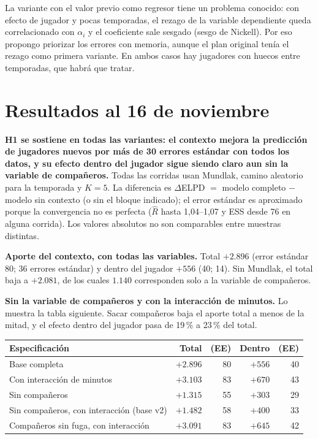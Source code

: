 \documentclass[11pt,a4paper]{article}
\newcommand{\lead}[1]{\textbf{#1}}
\begin{document}
La variante con el valor previo como regresor tiene un problema conocido: con efecto de jugador y pocas temporadas, el rezago de la variable dependiente queda correlacionado con $\alpha_i$ y el coeficiente sale sesgado (sesgo de Nickell). Por eso propongo priorizar los errores con memoria, aunque el plan original tenía el rezago como primera variante. En ambos casos hay jugadores con huecos entre temporadas, que habrá que tratar.


\section{Resultados al 16 de noviembre}

\lead{H1 se sostiene en todas las variantes: el contexto mejora la predicción de jugadores nuevos por más de 30 errores estándar con todos los datos, y su efecto dentro del jugador sigue siendo claro aun sin la variable de compañeros.} Todas las corridas usan Mundlak, camino aleatorio para la temporada y $K=5$. La diferencia es $\Delta$ELPD $=$ modelo completo $-$ modelo sin contexto (o sin el bloque indicado); el error estándar es aproximado porque la convergencia no es perfecta ($\hat R$ hasta 1,04--1,07 y ESS desde 76 en alguna corrida). Los valores absolutos no son comparables entre muestras distintas.

\lead{Aporte del contexto, con todas las variables.} Total $+2.896$ (error estándar 80; 36 errores estándar) y dentro del jugador $+556$ (40; 14). Sin Mundlak, el total baja a $+2.081$, de los cuales $1.140$ corresponden solo a la variable de compañeros.

\lead{Sin la variable de compañeros y con la interacción de minutos.} Lo muestra la tabla siguiente. Sacar compañeros baja el aporte total a menos de la mitad, y el efecto dentro del jugador pasa de 19\,\% a 23\,\% del total.

\begin{center}
\small
\begin{tabular}{@{}lrrrr@{}}
\toprule
Especificación & Total & (EE) & Dentro & (EE) \\
\midrule
Base completa & $+2.896$ & 80 & $+556$ & 40 \\
Con interacción de minutos & $+3.103$ & 83 & $+670$ & 43 \\
Sin compañeros & $+1.315$ & 55 & $+303$ & 29 \\
Sin compañeros, con interacción (base v2) & $+1.482$ & 58 & $+400$ & 33 \\
Compañeros sin fuga, con interacción & $+3.091$ & 83 & $+645$ & 42 \\
\bottomrule
\end{tabular}
\end{center}
\end{document}
